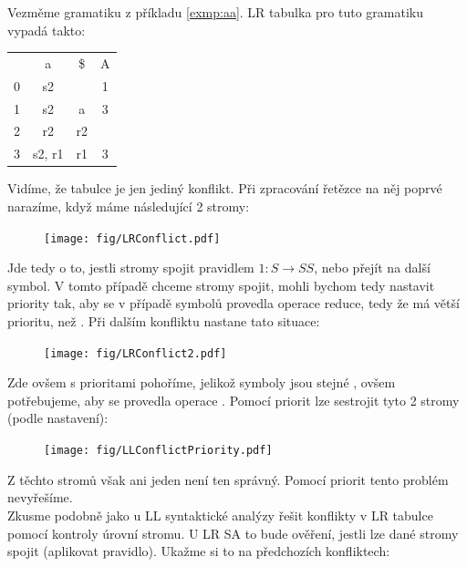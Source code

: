 \begin{exmp}
  Vezměme gramatiku z příkladu \ref{exmp:aa}. LR tabulka pro tuto gramatiku
  vypadá takto:
  \begin{table}[H]
    \centering
    \begin{tabular}{| c || c | c | c |}
      \hline
        &	a  &	\$ &	A \\
      \hhline{|=||=|=|=|}
      0 &	s2 &    & 1 \\
      \hline
      1	& s2 & a	& 3 \\
      \hline
      2	& r2 & r2 &   \\
      \hline
      3 & s2, r1& r1 & 3 \\
      \hline
    \end{tabular}
  \end{table}

  Vidíme, že tabulce je jen jediný konflikt. Při zpracování řetězce
   na něj poprvé narazíme, když máme následující 2 stromy:

  \begin{figure}[H]
    \centering
    \texttt{[image: fig/LRConflict.pdf]}
  \end{figure}

  Jde tedy o to, jestli stromy spojit pravidlem $1: S \rightarrow SS$, nebo přejít
  na další symbol. V tomto případě chceme stromy spojit, mohli bychom tedy
  nastavit priority tak, aby se v případě symbolů \symb{[S, a]} provedla operace
  reduce, tedy že  má větší prioritu, než . Při dalším konfliktu nastane
  tato situace:

  \begin{figure}[H]
    \centering
    \texttt{[image: fig/LRConflict2.pdf]}
  \end{figure}

  Zde ovšem s prioritami pohoříme, jelikož symboly jsou stejné \symb{[S, a]},
  ovšem potřebujeme, aby se provedla operace . Pomocí priorit lze
  sestrojit tyto 2 stromy (podle nastavení):

  \begin{figure}[H]
    \centering
    \texttt{[image: fig/LLConflictPriority.pdf]}
  \end{figure}

  Z těchto stromů však ani jeden není ten správný. Pomocí priorit tento problém
  nevyřešíme.\\

  Zkusme podobně jako u LL syntaktické analýzy řešit konflikty v LR tabulce
  pomocí kontroly úrovní stromu. U LR SA to bude ověření, jestli lze
  dané stromy spojit (aplikovat pravidlo). Ukažme si to na předchozích
  konfliktech:


\end{exmp}
